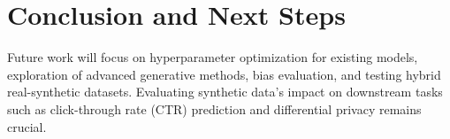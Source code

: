 \documentclass{article}
\begin{document}
\section{Conclusion and Next Steps}
Future work will focus on hyperparameter optimization for existing models, exploration of advanced generative methods, bias evaluation, and testing hybrid real-synthetic datasets. Evaluating synthetic data's impact on downstream tasks such as click-through rate (CTR) prediction and differential privacy remains crucial.
\end{document}
